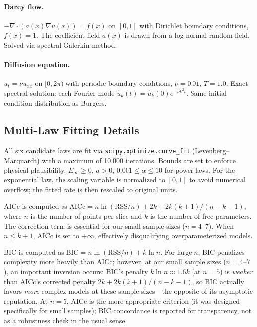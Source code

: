 \documentclass[11pt]{article}
\newcommand{\Einf}{E_\infty}
\begin{document}
\paragraph{Darcy flow.}
$-\nabla \cdot (a(x) \nabla u(x)) = f(x)$ on $[0, 1]$ with Dirichlet
boundary conditions, $f(x) = 1$. The coefficient field $a(x)$ is drawn
from a log-normal random field. Solved via spectral Galerkin method.

\paragraph{Diffusion equation.}
$u_t = \nu u_{xx}$ on $[0, 2\pi)$ with periodic boundary conditions,
$\nu = 0.01$, $T = 1.0$. Exact spectral solution: each Fourier mode
$\hat{u}_k(t) = \hat{u}_k(0) e^{-\nu k^2 t}$. Same initial condition
distribution as Burgers.

\subsection{Multi-Law Fitting Details}

All six candidate laws are fit via \texttt{scipy.optimize.curve\_fit}
(Levenberg--Marquardt) with a maximum of 10{,}000 iterations. Bounds
are set to enforce physical plausibility: $\Einf \geq 0$, $a > 0$,
$0.001 \leq \alpha \leq 10$ for power laws. For the exponential law,
the scaling variable is normalized to $[0, 1]$ to avoid numerical
overflow; the fitted rate is then rescaled to original units.

AICc is computed as
$\mathrm{AICc} = n \ln(\mathrm{RSS}/n) + 2k + 2k(k+1)/(n-k-1)$,
where $n$ is the number of points per slice and $k$ is the number of
free parameters. The correction term is essential for our small sample
sizes ($n = 4$--$7$). When $n \leq k + 1$, AICc is set to $+\infty$,
effectively disqualifying overparameterized models.

BIC is computed as $\mathrm{BIC} = n \ln(\mathrm{RSS}/n) + k \ln n$.
For large $n$, BIC penalizes complexity more heavily than AICc;
however, at our small sample sizes ($n = 4$--$7$), an important
inversion occurs: BIC's penalty $k \ln n \approx 1.6k$ (at $n=5$)
is \emph{weaker} than AICc's corrected penalty
$2k + 2k(k+1)/(n-k-1)$, so BIC actually favors \emph{more} complex
models at these sample sizes---the opposite of its asymptotic
reputation. At $n = 5$, AICc is the more appropriate criterion
(it was designed specifically for small samples); BIC concordance
is reported for transparency, not as a robustness check in the
usual sense.
\end{document}

